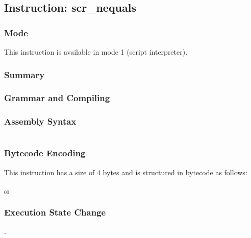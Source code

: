 \subsection{Instruction: scr\_nequals}

\subsubsection{Mode}
This instruction is available in mode 1 (script interpreter).
\subsubsection{Summary}


\subsubsection{Grammar and Compiling}


\subsubsection{Assembly Syntax}

\begin{myquote}
\begin{verbatim}

\end{verbatim}
\end{myquote}

\subsubsection{Bytecode Encoding}

This instruction has a size of 4 bytes and is structured in bytecode as follows:

$_{00}$\ 

\subsubsection{Execution State Change}

.



